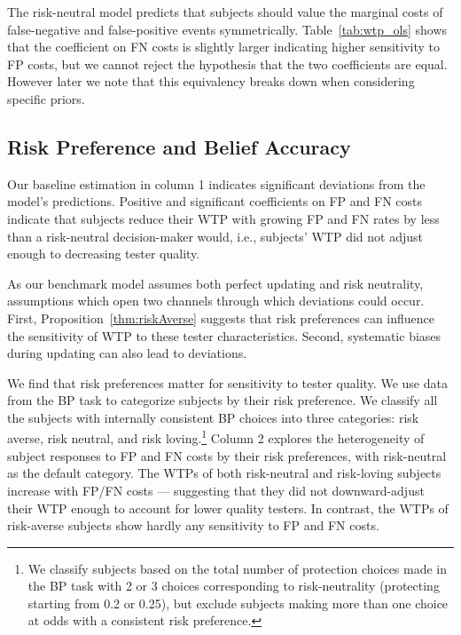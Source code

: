 \documentclass[12pt,a4paper]{article}
\begin{document}
		


The risk-neutral model predicts that subjects should value the marginal costs of false-negative and false-positive events symmetrically. Table~\ref{tab:wtp_ols} shows that the coefficient on FN costs is slightly larger indicating higher sensitivity to FP costs, but we cannot reject the hypothesis that the two coefficients are equal. However later we note that this equivalency breaks down when considering specific priors.

\subsection{Risk Preference and Belief Accuracy}

Our baseline estimation in column 1 indicates significant deviations from the model's predictions. Positive and significant coefficients on FP and FN costs indicate that subjects reduce their WTP with growing FP and FN rates by less than a risk-neutral decision-maker would, i.e., subjects' WTP did not adjust enough to decreasing tester quality.

As our benchmark model assumes both perfect updating and risk neutrality, assumptions which open two channels through which deviations could occur. First, Proposition~\ref{thm:riskAverse} suggests that risk preferences can influence the sensitivity of WTP to these tester characteristics. Second, systematic biases during updating can also lead to deviations. 

We find that risk preferences matter for sensitivity to tester quality. We use data from the BP task to categorize subjects by their risk preference. We classify all the subjects with internally consistent BP choices into three categories: risk averse, risk neutral, and risk loving.\footnote{We classify subjects based on the total number of protection choices made in the BP task with 2 or 3 choices corresponding to risk-neutrality (protecting starting from 0.2 or 0.25), but exclude subjects making more than one choice at odds with a consistent risk preference.} Column 2 explores the heterogeneity of subject responses to FP and FN costs by their risk preferences, with risk-neutral as the default category. 
The WTPs of both risk-neutral and risk-loving subjects increase with FP/FN costs --- suggesting that they did not downward-adjust their WTP enough to account for lower quality testers. In contrast, the WTPs of risk-averse subjects show hardly any sensitivity to FP and FN costs.  
\end{document}
